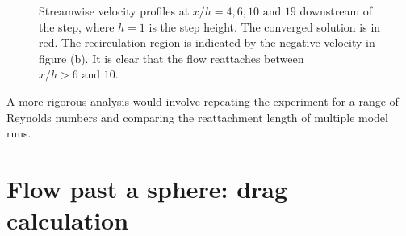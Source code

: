 \begin{figure}
\centering
{}
\caption{Streamwise velocity profiles at $x/h=4, 6, 10 \text{ and } 19$ downstream of the step,
where $h=1$ is the step height. The converged solution is in red.
The recirculation region is indicated by the negative velocity in figure (b).
It is clear that the flow reattaches between $x/h>6 \text{ and } 10$.}
\label{Fig:UProfiles3d}
\end{figure}






A more rigorous analysis would involve
repeating the experiment for a range of Reynolds numbers and comparing the reattachment
length of multiple model runs.


\section{Flow past a sphere: drag calculation}
\label{sect:flow_past_sphere}
